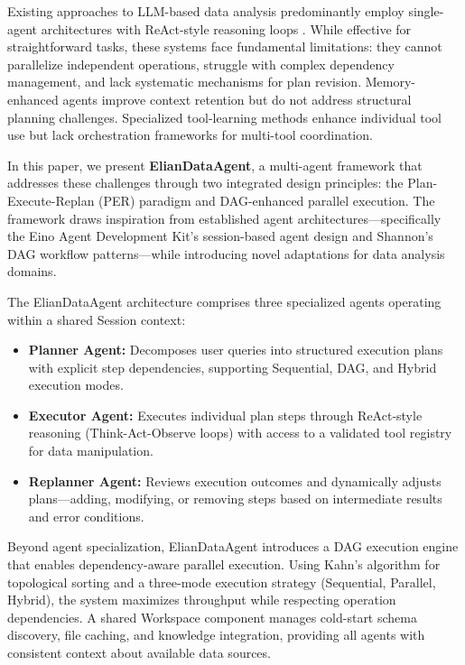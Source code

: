 \documentclass{article}
\theoremstyle{definition}
\begin{document}
Existing approaches to LLM-based data analysis predominantly employ single-agent architectures with ReAct-style reasoning loops \cite{yao2022react}. While effective for straightforward tasks, these systems face fundamental limitations: they cannot parallelize independent operations, struggle with complex dependency management, and lack systematic mechanisms for plan revision. Memory-enhanced agents \cite{zhong2024memorybank,packer2023memgpt} improve context retention but do not address structural planning challenges. Specialized tool-learning methods \cite{schick2023toolformer,tang2023toolalpaca,qintoolllm} enhance individual tool use but lack orchestration frameworks for multi-tool coordination.

In this paper, we present \textbf{ElianDataAgent}, a multi-agent framework that addresses these challenges through two integrated design principles: the Plan-Execute-Replan (PER) paradigm and DAG-enhanced parallel execution. The framework draws inspiration from established agent architectures---specifically the Eino Agent Development Kit's session-based agent design and Shannon's DAG workflow patterns---while introducing novel adaptations for data analysis domains.

The ElianDataAgent architecture comprises three specialized agents operating within a shared Session context:

\begin{itemize}[leftmargin=*, align=left]
    \item \textbf{Planner Agent:} Decomposes user queries into structured execution plans with explicit step dependencies, supporting Sequential, DAG, and Hybrid execution modes.
    \item \textbf{Executor Agent:} Executes individual plan steps through ReAct-style reasoning (Think-Act-Observe loops) with access to a validated tool registry for data manipulation.
    \item \textbf{Replanner Agent:} Reviews execution outcomes and dynamically adjusts plans---adding, modifying, or removing steps based on intermediate results and error conditions.
\end{itemize}

Beyond agent specialization, ElianDataAgent introduces a DAG execution engine that enables dependency-aware parallel execution. Using Kahn's algorithm for topological sorting and a three-mode execution strategy (Sequential, Parallel, Hybrid), the system maximizes throughput while respecting operation dependencies. A shared Workspace component manages cold-start schema discovery, file caching, and knowledge integration, providing all agents with consistent context about available data sources.
\end{document}
